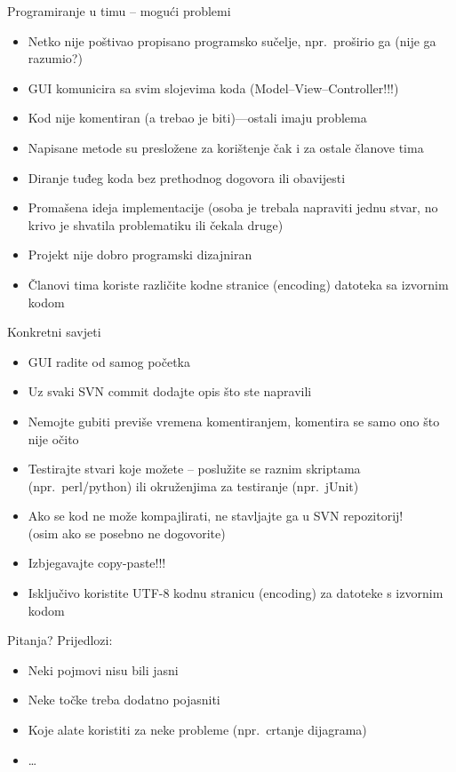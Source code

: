 \documentclass{beamer}
\begin{document}
\begin{frame}[t]{Programiranje u timu -- mogući problemi}
\begin{itemize}
  \item Netko nije poštivao propisano programsko sučelje, npr.~proširio ga (nije
  ga razumio?)
  \item GUI komunicira sa svim slojevima koda (Model--View--Controller!!!)
  \item Kod nije komentiran (a trebao je biti)---ostali imaju problema
  \item Napisane metode su presložene za korištenje čak i za ostale članove tima
  \item Diranje tuđeg koda bez prethodnog dogovora ili obavijesti
  \item Promašena ideja implementacije (osoba je trebala napraviti jednu stvar,
  no krivo je shvatila problematiku ili čekala druge)
  \item Projekt nije dobro programski dizajniran
  \item Članovi tima koriste različite kodne stranice (encoding) datoteka sa
  izvornim kodom
\end{itemize}
\end{frame}

\begin{frame}[t]{Konkretni savjeti}
\begin{itemize}
  \item GUI radite od samog početka
  \item Uz svaki SVN commit dodajte opis što ste napravili
  \item Nemojte gubiti previše vremena komentiranjem, komentira se samo ono što
  nije očito
  \item Testirajte stvari koje možete -- poslužite se raznim skriptama
  (npr.~perl/python) ili okruženjima za testiranje (npr.~jUnit)
  \item Ako se kod ne može kompajlirati, ne stavljajte ga u SVN repozitorij!\\
  (osim ako se posebno ne dogovorite)
  \item Izbjegavajte copy-paste!!!
  \item Isključivo koristite UTF-8 kodnu stranicu (encoding) za datoteke s
  izvornim kodom
\end{itemize}
\end{frame}

\begin{frame}[t]{Pitanja?}
Prijedlozi:
\begin{itemize}
  \item Neki pojmovi nisu bili jasni
  \item Neke točke treba dodatno pojasniti
  \item Koje alate koristiti za neke probleme (npr.~crtanje dijagrama)
  \item \ldots
\end{itemize}
\end{frame}
\end{document}
